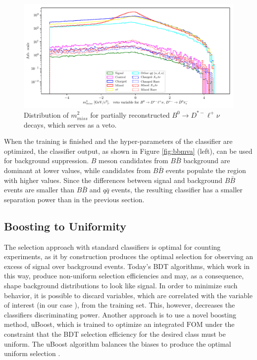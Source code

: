 \begin{figure}[H]
	\centering
	\captionsetup{width=0.8\linewidth}
	\includegraphics[width=\linewidth]{fig/bb_partial_veto}
	\caption{Distribution of $m_{miss}^2$ for partially reconstructed $B^0 \to D^{*-} \ell^+ \nu$ decays, which serves as a veto.}
	\label{fig:vetoplot}
\end{figure}

When the training is finished and the hyper-parameters of the classifier are optimized, the classifier output, as shown in Figure \ref{fig:bbmva} (left), can be used for background suppression. $B$ meson candidates from $B \bar B$ background are dominant at lower values, while candidates from $B \bar B$ events populate the region with higher values. Since the differences between signal and background $B \bar B$ events are smaller than $B \bar B$ and $q \bar q$ events, the resulting classifier has a smaller separation power than in the previous section.

\subsection{Boosting to Uniformity}
The selection approach with standard classifiers is optimal for counting experiments, as it by construction produces the optimal selection for observing an excess of  signal over background events. Today's BDT algorithms, which work in this way, produce non-uniform selection efficiencies and may, as a consequence, shape background distributions to look like signal. In order to minimize such behavior, it is possible to discard variables, which are correlated with the variable of interest (in our case \vars), from the training set. This, however, decreases the classifiers discriminating power. Another approach is to use a novel boosting method, uBoost, which is trained to optimize an integrated $\mathrm{FOM}$ under the constraint that the BDT selection efficiency for the desired class must be uniform. The uBoost algorithm balances the biases to produce the optimal uniform selection \cite{stevens2013uboost}.

